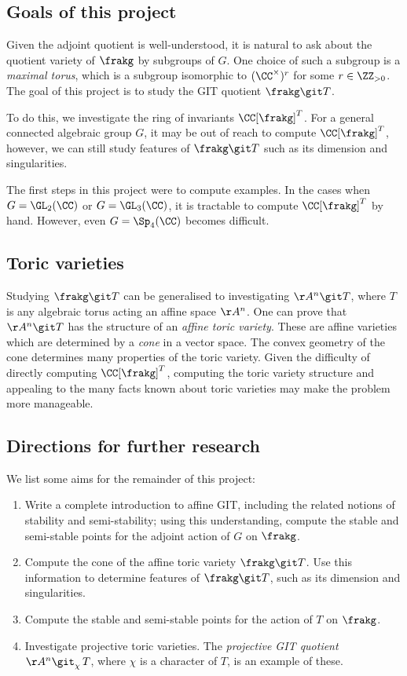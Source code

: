 \documentclass[12pt]{amsart}
\theoremstyle{plain}
\begin{document}
\subsection{Goals of this project}
Given the adjoint quotient is well-understood, it is natural to ask about the quotient variety of $\frakg$ by subgroups of $G$.
One choice of such a subgroup is a \emph{maximal torus}, which is a subgroup isomorphic to $(\CC^\times)^r$ for some $r \in \ZZ_{> 0}$.
The goal of this project is to study the GIT quotient $\frakg \git T$.

To do this, we investigate the ring of invariants $\CC[\frakg]^T$.
For a general connected algebraic group $G$, it may be out of reach to compute $\CC[\frakg]^T$, however, we can still study features of $\frakg \git T$ such as its dimension and singularities.

The first steps in this project were to compute examples.
In the cases when $G = \GL_2(\CC)$ or $G = \GL_3(\CC)$, it is tractable to compute $\CC[\frakg]^T$ by hand.
However, even $G = \Sp_4(\CC)$ becomes difficult.

\subsection{Toric varieties}
Studying $\frakg \git T$ can be generalised to investigating $\AA^n \git T$, where $T$ is any algebraic torus acting an affine space $\AA^n$.
One can prove that $\AA^n \git T$ has the structure of an \emph{affine toric variety}.
These are affine varieties which are determined by a \emph{cone} in a vector space.
The convex geometry of the cone determines many properties of the toric variety.
Given the difficulty of directly computing $\CC[\frakg]^T$, computing the toric variety structure and appealing to the many facts known about toric varieties may make the problem more manageable.

\subsection{Directions for further research}
We list some aims for the remainder of this project:
\begin{enumerate}
\item
Write a complete introduction to affine GIT, including the related notions of stability and semi-stability;
using this understanding, compute the stable and semi-stable points for the adjoint action of $G$ on $\frakg$.

\item
Compute the cone of the affine toric variety $\frakg \git T$.
Use this information to determine features of $\frakg \git T$, such as its dimension and singularities.

\item
Compute the stable and semi-stable points for the action of $T$ on $\frakg$.

\item
Investigate projective toric varieties.
The \emph{projective GIT quotient} $\AA^n \git_\chi \, T$, where $\chi$ is a character of $T$, is an example of these.
\end{enumerate}
\end{document}
